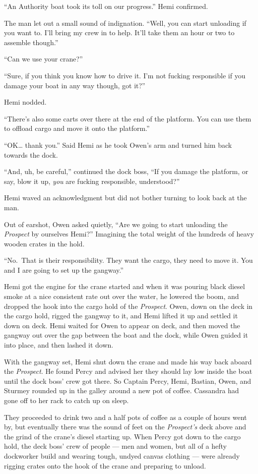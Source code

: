 \documentclass[
]{scrbook}
\begin{document}
``An Authority boat took its toll on our progress.'' Hemi confirmed.

The man let out a small sound of indignation. ``Well, you can start
unloading if you want to. I'll bring my crew in to help. It'll take them
an hour or two to assemble though.''

``Can we use your crane?''

``Sure, if you think you know how to drive it. I'm not fucking
responsible if you damage your boat in any way though, got it?''

Hemi nodded.

``There's also some carts over there at the end of the platform. You can
use them to offload cargo and move it onto the platform.''

``OK\ldots{} thank you.'' Said Hemi as he took Owen's arm and turned him
back towards the dock.

``And, uh, be careful,'' continued the dock boss, ``If you damage the
platform, or say, blow it up, \emph{you} are fucking responsible,
understood?''

Hemi waved an acknowledgment but did not bother turning to look back at
the man.

Out of earshot, Owen asked quietly, ``Are we going to start unloading
the \emph{Prospect} by ourselves Hemi?'' Imagining the total weight of
the hundreds of heavy wooden crates in the hold.

``No.~That is their responsibility. They want the cargo, they need to
move it. You and I are going to set up the gangway.''

Hemi got the engine for the crane started and when it was pouring black
diesel smoke at a nice consistent rate out over the water, he lowered
the boom, and dropped the hook into the cargo hold of the
\emph{Prospect}. Owen, down on the deck in the cargo hold, rigged the
gangway to it, and Hemi lifted it up and settled it down on deck. Hemi
waited for Owen to appear on deck, and then moved the gangway out over
the gap between the boat and the dock, while Owen guided it into place,
and then lashed it down.

With the gangway set, Hemi shut down the crane and made his way back
aboard the \emph{Prospect}. He found Percy and advised her they should
lay low inside the boat until the dock boss' crew got there. So Captain
Percy, Hemi, Bastian, Owen, and Sturmey rounded up in the galley around
a new pot of coffee. Cassandra had gone off to her rack to catch up on
sleep.

They proceeded to drink two and a half pots of coffee as a couple of
hours went by, but eventually there was the sound of feet on the
\emph{Prospect's} deck above and the grind of the crane's diesel
starting up. When Percy got down to the cargo hold, the deck boss' crew
of people --- men and women, but all of a hefty dockworker build and
wearing tough, undyed canvas clothing --- were already rigging crates
onto the hook of the crane and preparing to unload.
\end{document}
